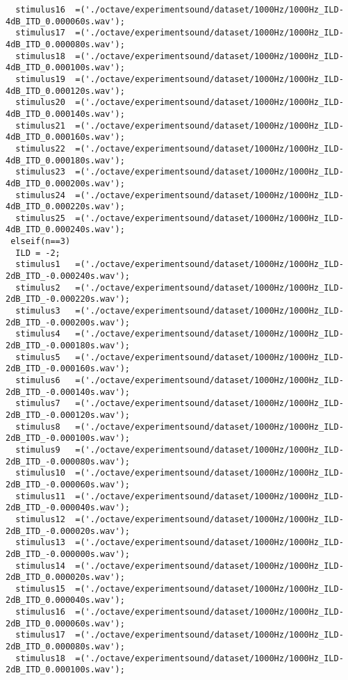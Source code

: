 {\begin{verbatim}
  stimulus16  =('./octave/experimentsound/dataset/1000Hz/1000Hz_ILD-4dB_ITD_0.000060s.wav');
  stimulus17  =('./octave/experimentsound/dataset/1000Hz/1000Hz_ILD-4dB_ITD_0.000080s.wav');
  stimulus18  =('./octave/experimentsound/dataset/1000Hz/1000Hz_ILD-4dB_ITD_0.000100s.wav');
  stimulus19  =('./octave/experimentsound/dataset/1000Hz/1000Hz_ILD-4dB_ITD_0.000120s.wav');
  stimulus20  =('./octave/experimentsound/dataset/1000Hz/1000Hz_ILD-4dB_ITD_0.000140s.wav');
  stimulus21  =('./octave/experimentsound/dataset/1000Hz/1000Hz_ILD-4dB_ITD_0.000160s.wav');
  stimulus22  =('./octave/experimentsound/dataset/1000Hz/1000Hz_ILD-4dB_ITD_0.000180s.wav');
  stimulus23  =('./octave/experimentsound/dataset/1000Hz/1000Hz_ILD-4dB_ITD_0.000200s.wav');
  stimulus24  =('./octave/experimentsound/dataset/1000Hz/1000Hz_ILD-4dB_ITD_0.000220s.wav');
  stimulus25  =('./octave/experimentsound/dataset/1000Hz/1000Hz_ILD-4dB_ITD_0.000240s.wav');
 elseif(n==3)
  ILD = -2;
  stimulus1   =('./octave/experimentsound/dataset/1000Hz/1000Hz_ILD-2dB_ITD_-0.000240s.wav');
  stimulus2   =('./octave/experimentsound/dataset/1000Hz/1000Hz_ILD-2dB_ITD_-0.000220s.wav');
  stimulus3   =('./octave/experimentsound/dataset/1000Hz/1000Hz_ILD-2dB_ITD_-0.000200s.wav');
  stimulus4   =('./octave/experimentsound/dataset/1000Hz/1000Hz_ILD-2dB_ITD_-0.000180s.wav');
  stimulus5   =('./octave/experimentsound/dataset/1000Hz/1000Hz_ILD-2dB_ITD_-0.000160s.wav');
  stimulus6   =('./octave/experimentsound/dataset/1000Hz/1000Hz_ILD-2dB_ITD_-0.000140s.wav');
  stimulus7   =('./octave/experimentsound/dataset/1000Hz/1000Hz_ILD-2dB_ITD_-0.000120s.wav');
  stimulus8   =('./octave/experimentsound/dataset/1000Hz/1000Hz_ILD-2dB_ITD_-0.000100s.wav');
  stimulus9   =('./octave/experimentsound/dataset/1000Hz/1000Hz_ILD-2dB_ITD_-0.000080s.wav');
  stimulus10  =('./octave/experimentsound/dataset/1000Hz/1000Hz_ILD-2dB_ITD_-0.000060s.wav');
  stimulus11  =('./octave/experimentsound/dataset/1000Hz/1000Hz_ILD-2dB_ITD_-0.000040s.wav');
  stimulus12  =('./octave/experimentsound/dataset/1000Hz/1000Hz_ILD-2dB_ITD_-0.000020s.wav');
  stimulus13  =('./octave/experimentsound/dataset/1000Hz/1000Hz_ILD-2dB_ITD_-0.000000s.wav');
  stimulus14  =('./octave/experimentsound/dataset/1000Hz/1000Hz_ILD-2dB_ITD_0.000020s.wav');
  stimulus15  =('./octave/experimentsound/dataset/1000Hz/1000Hz_ILD-2dB_ITD_0.000040s.wav');
  stimulus16  =('./octave/experimentsound/dataset/1000Hz/1000Hz_ILD-2dB_ITD_0.000060s.wav');
  stimulus17  =('./octave/experimentsound/dataset/1000Hz/1000Hz_ILD-2dB_ITD_0.000080s.wav');
  stimulus18  =('./octave/experimentsound/dataset/1000Hz/1000Hz_ILD-2dB_ITD_0.000100s.wav');

\end{verbatim}}
